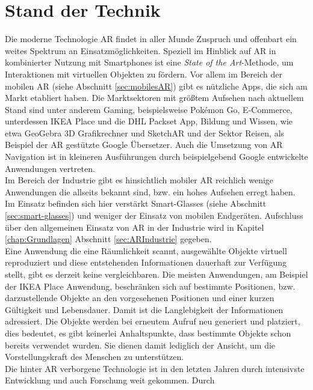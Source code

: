 \section{Stand der Technik}
\label{chap:Stand der Technik}
Die moderne Technologie \acl{AR} findet in aller Munde Zuspruch und offenbart ein weites Spektrum an Einsatzmöglichkeiten. 
Speziell im Hinblick auf \acl{AR} in kombinierter Nutzung mit Smartphones ist eine \textit{State of the Art}-Methode, 
um Interaktionen mit virtuellen Objekten zu fördern. Vor allem im Bereich der mobilen \acs{AR} (siehe Abschnitt \ref{sec:mobilesAR}) 
gibt es nützliche Apps, die sich am Markt etabliert haben. Die Marktsektoren mit größtem Aufsehen nach aktuellem Stand sind unter anderem 
Gaming, beispielsweise Pokémon Go, E-Commerce, unterdessen IKEA Place und die DHL Packset App, Bildung und Wissen, wie etwa GeoGebra 3D 
Grafikrechner und SketchAR und der Sektor Reisen, als Beispiel der \acs{AR} gestützte Google Übersetzer. Auch die Umsetzung von \acl{AR} 
Navigation ist in kleineren Ausführungen durch beispielgebend Google entwickelte Anwendungen vertreten. 
\\ 
Im Bereich der Industrie gibt es hinsichtlich mobiler \acs{AR} 
reichlich wenige Anwendungen die allseits bekannt sind, bzw. ein hohes Aufsehen erregt haben. Im Einsatz befinden sich hier verstärkt Smart-Glasses (siehe Abschnitt 
\ref{sec:smart-glasses}) und weniger der Einsatz von mobilen Endgeräten. Aufschluss über den allgemeinen Einsatz von \acs{AR} in der Industrie wird in Kapitel 
\ref{chap:Grundlagen} Abschnitt \ref{sec:ARIndustrie} gegeben. 
\\ 
\linebreak
Eine Anwendung die eine Räumlichkeit scannt, ausgewählte Objekte virtuell reproduziert und diese entstehenden Informationen dauerhaft zur 
Verfügung stellt, gibt es derzeit keine vergleichbaren. Die meisten Anwendungen, am Beispiel der IKEA Place Anwendung, beschränken sich 
auf bestimmte Positionen, bzw. darzustellende Objekte an den vorgesehenen Positionen und einer kurzen Gültigkeit und Lebensdauer. 
Damit ist die Langlebigkeit der Informationen adressiert. Die Objekte werden bei erneutem Aufruf neu generiert und platziert, dies bedeutet, 
es gibt keinerlei Anhaltspunkte, dass bestimmte Objekte schon bereits verwendet wurden. Sie dienen damit lediglich der Ansicht, um die 
Vorstellungskraft des Menschen zu unterstützen. 
\\ 
\linebreak
Die hinter \acs{AR} verborgene Technologie ist in den letzten Jahren durch intensivste Entwicklung und auch Forschung weit gekommen. Durch 
